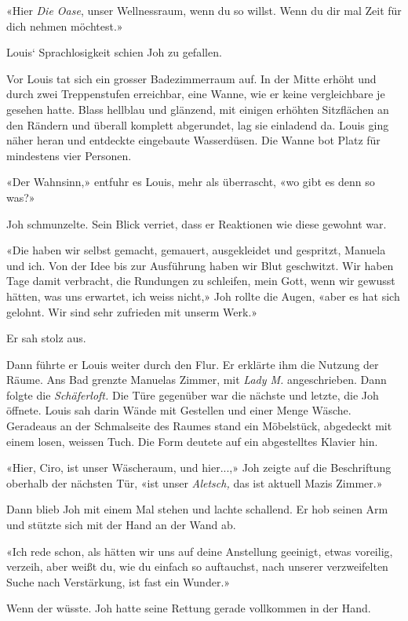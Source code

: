 «Hier \emph{Die Oase}, unser Wellnessraum, wenn du so willst. Wenn du
dir mal Zeit für dich nehmen möchtest.»

Louis` Sprachlosigkeit schien Joh zu gefallen.

Vor Louis tat sich ein grosser Badezimmerraum auf. In der Mitte erhöht
und durch zwei Treppenstufen erreichbar, eine Wanne, wie er keine
vergleichbare je gesehen hatte. Blass hellblau und glänzend, mit einigen
erhöhten Sitzflächen an den Rändern und überall komplett abgerundet, lag
sie einladend da. Louis ging näher heran und entdeckte eingebaute
Wasserdüsen. Die Wanne bot Platz für mindestens vier Personen.

«Der Wahnsinn,» entfuhr es Louis, mehr als überrascht, «wo gibt es denn
so was?»

Joh schmunzelte. Sein Blick verriet, dass er Reaktionen wie diese
gewohnt war.

«Die haben wir selbst gemacht, gemauert, ausgekleidet und gespritzt,
Manuela und ich. Von der Idee bis zur Ausführung haben wir Blut
geschwitzt. Wir haben Tage damit verbracht, die Rundungen zu schleifen,
mein Gott, wenn wir gewusst hätten, was uns erwartet, ich weiss nicht,»
Joh rollte die Augen, «aber es hat sich gelohnt. Wir sind sehr zufrieden
mit unserm Werk.»

Er sah stolz aus.

Dann führte er Louis weiter durch den Flur. Er erklärte ihm die Nutzung
der Räume. Ans Bad grenzte Manuelas Zimmer, mit \emph{Lady M.}
angeschrieben. Dann folgte die \emph{Schäferloft.} Die Türe gegenüber
war die nächste und letzte, die Joh öffnete. Louis sah darin Wände mit
Gestellen und einer Menge Wäsche. Geradeaus an der Schmalseite des
Raumes stand ein Möbelstück, abgedeckt mit einem losen, weissen Tuch.
Die Form deutete auf ein abgestelltes Klavier hin.

«Hier, Ciro, ist unser Wäscheraum, und hier...,» Joh zeigte auf die
Beschriftung oberhalb der nächsten Tür, «ist unser \emph{Aletsch,} das
ist aktuell Mazis Zimmer.»

Dann blieb Joh mit einem Mal stehen und lachte schallend. Er hob seinen
Arm und stützte sich mit der Hand an der Wand ab.

«Ich rede schon, als hätten wir uns auf deine Anstellung geeinigt, etwas
voreilig, verzeih, aber weißt du, wie du einfach so auftauchst, nach
unserer verzweifelten Suche nach Verstärkung, ist fast ein Wunder.»

Wenn der wüsste. Joh hatte seine Rettung gerade vollkommen in der Hand.

